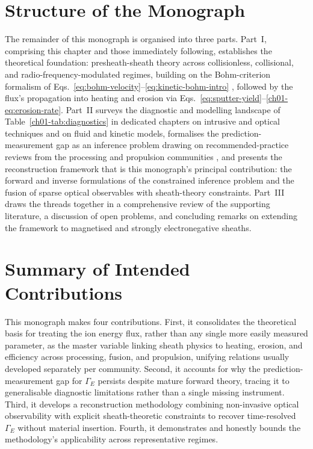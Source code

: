\section{Structure of the Monograph}

The remainder of this monograph is organised into three parts. Part~I, comprising this chapter and those immediately following, establishes the theoretical foundation: presheath-sheath theory across collisionless, collisional, and radio-frequency-modulated regimes, building on the Bohm-criterion formalism of Eqs.~\eqref{eq:bohm-velocity}--\eqref{eq:kinetic-bohm-intro} \cite{ref0001,ref0017,ref0023}, followed by the flux's propagation into heating and erosion via Eqs.~\eqref{eq:sputter-yield}--\eqref{ch01-eq:erosion-rate}. Part~II surveys the diagnostic and modelling landscape of Table~\ref{ch01-tab:diagnostics} in dedicated chapters on intrusive and optical techniques and on fluid and kinetic models, formalises the prediction-measurement gap as an inference problem drawing on recommended-practice reviews from the processing and propulsion communities \cite{ref0490,ref0511,ref0506,ref0496}, and presents the reconstruction framework that is this monograph's principal contribution: the forward and inverse formulations of the constrained inference problem and the fusion of sparse optical observables with sheath-theory constraints. Part~III draws the threads together in a comprehensive review of the supporting literature, a discussion of open problems, and concluding remarks on extending the framework to magnetised and strongly electronegative sheaths.

\section{Summary of Intended Contributions}

This monograph makes four contributions. First, it consolidates the theoretical basis for treating the ion energy flux, rather than any single more easily measured parameter, as the master variable linking sheath physics to heating, erosion, and efficiency across processing, fusion, and propulsion, unifying relations usually developed separately per community. Second, it accounts for why the prediction-measurement gap for $\Gamma_E$ persists despite mature forward theory, tracing it to generalisable diagnostic limitations rather than a single missing instrument. Third, it develops a reconstruction methodology combining non-invasive optical observability with explicit sheath-theoretic constraints to recover time-resolved $\Gamma_E$ without material insertion. Fourth, it demonstrates and honestly bounds the methodology's applicability across representative regimes.

